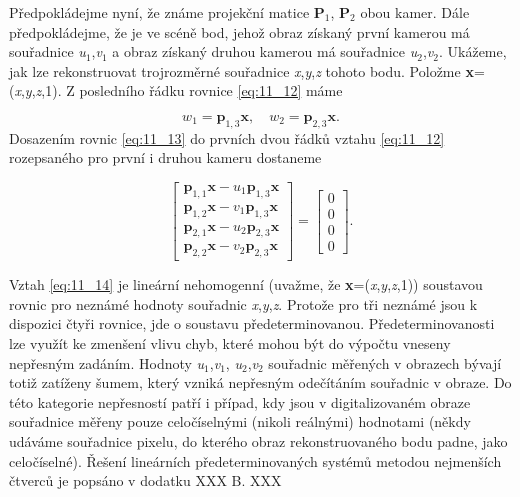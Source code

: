 Předpokládejme nyní, že známe projekční matice \textbf{P}$_1$, \textbf{P}$_2$ obou kamer. Dále předpokládejme, že je ve scéně bod, jehož obraz získaný první kamerou má souřadnice \textit{u}$_1$,\textit{v}$_1$ a obraz získaný druhou kamerou má souřadnice \textit{u}$_2$,\textit{v}$_2$. Ukážeme, jak lze rekonstruovat trojrozměrné souřadnice \textit{x},\textit{y},\textit{z} tohoto bodu. Položme \textbf{x}=(\textit{x},\textit{y},\textit{z},1). Z posledního řádku rovnice \eqref{eq:11_12} máme

\begin{equation} \label{eq:11_13}
    w_{1} = \mathbf{p}_{1,3} \mathbf{x}, \quad w_{2} = \mathbf{p}_{2,3} \mathbf{x}.
\end{equation}
Dosazením rovnic \eqref{eq:11_13} do prvních dvou řádků vztahu \eqref{eq:11_12} rozepsaného pro první i druhou kameru dostaneme

\begin{equation} \label{eq:11_14}
    \left[
    \begin{array}{c}
    {\mathbf{p}_{1,1} \mathbf{x} - u_{1} \mathbf{p}_{1,3} \mathbf{x}} \\
    {\mathbf{p}_{1,2} \mathbf{x} - v_{1} \mathbf{p}_{1,3} \mathbf{x}} \\
    {\mathbf{p}_{2,1} \mathbf{x} - u_{2} \mathbf{p}_{2,3} \mathbf{x}} \\
    {\mathbf{p}_{2,2} \mathbf{x} - v_{2} \mathbf{p}_{2,3} \mathbf{x}}
    \end{array}
    \right]
    =
    \left[
    \begin{array}{c}
    {0} \\
    {0} \\
    {0} \\
    {0}
    \end{array}
    \right].  
\end{equation}

Vztah \eqref{eq:11_14} je lineární nehomogenní (uvažme, že \textbf{x}=(\textit{x},\textit{y},\textit{z},1)) soustavou rovnic pro neznámé hodnoty souřadnic \textit{x},\textit{y},\textit{z}. Protože pro tři neznámé jsou k dispozici čtyři rovnice, jde o soustavu předeterminovanou. Předeterminovanosti lze využít ke zmenšení vlivu chyb, které mohou být do výpočtu vneseny nepřesným zadáním. Hodnoty \textit{u}$_1$,\textit{v}$_1$, \textit{u}$_2$,\textit{v}$_2$ souřadnic měřených v obrazech bývají totiž zatíženy šumem, který vzniká nepřesným odečítáním souřadnic v obraze. Do této kategorie nepřesností patří i případ, kdy jsou v digitalizovaném obraze souřadnice měřeny pouze celočíselnými (nikoli reálnými) hodnotami (někdy udáváme souřadnice pixelu, do kterého obraz rekonstruovaného bodu padne, jako celočíselné). Řešení lineárních předeterminovaných systémů metodou nejmenších čtverců je popsáno v dodatku XXX B. XXX

